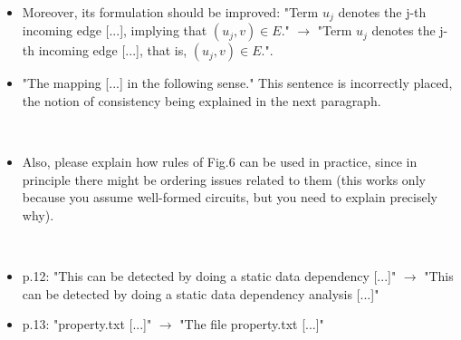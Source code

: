 \begin{itemize}
\item Moreover, its formulation should be improved: "Term $u_j$ denotes the j-th
incoming edge [...], implying that $(u_j,v) \in E$." $\rightarrow$ "Term $u_j$ denotes the j-th
incoming edge [...], that is, $(u_j,v) \in E$.".

\done

\item 
"The mapping [...] in the following sense." This sentence is incorrectly
placed, the notion of consistency being explained in the next paragraph.

~


\item Also, please explain how rules of Fig.6 can be used in practice, since in
principle there might be ordering issues related to them (this works only
because you assume well-formed circuits, but you need to explain precisely why).

~


\item p.12: "This can be detected by doing a static data dependency [...]" $\rightarrow$ "This
can be detected by doing a static data dependency analysis [...]"

\done

\item p.13: "property.txt [...]" $\rightarrow$ "The file property.txt [...]"

\done

\end{itemize}




